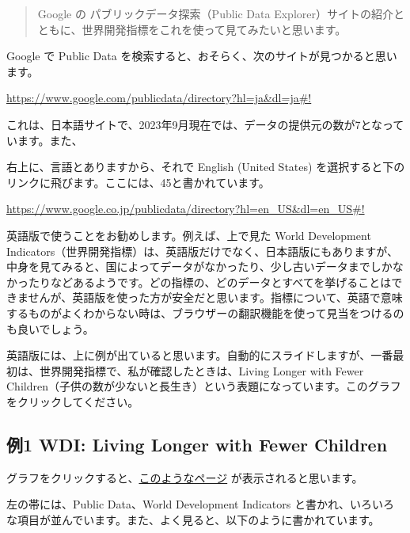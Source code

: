 \documentclass[
  xelatex, ja=standard]{bxjsbook}
\theoremstyle{definition}
\theoremstyle{definition}
\theoremstyle{definition}
\theoremstyle{definition}
\theoremstyle{remark}
\begin{document}
\begin{quote}
Google の パブリックデータ探索（Public Data Explorer）サイトの紹介とともに、世界開発指標をこれを使って見てみたいと思います。
\end{quote}

Google で Public Data を検索すると、おそらく、次のサイトが見つかると思います。

\url{https://www.google.com/publicdata/directory?hl=ja\&dl=ja\#!}

これは、日本語サイトで、2023年9月現在では、データの提供元の数が7となっています。また、

右上に、言語とありますから、それで English (United States) を選択すると下のリンクに飛びます。ここには、45と書かれています。

\url{https://www.google.co.jp/publicdata/directory?hl=en_US\&dl=en_US\#!}

英語版で使うことをお勧めします。例えば、上で見た World Development Indicators（世界開発指標）は、英語版だけでなく、日本語版にもありますが、中身を見てみると、国によってデータがなかったり、少し古いデータまでしかなかったりなどあるようです。どの指標の、どのデータとすべてを挙げることはできませんが、英語版を使った方が安全だと思います。指標について、英語で意味するものがよくわからない時は、ブラウザーの翻訳機能を使って見当をつけるのも良いでしょう。

英語版には、上に例が出ていると思います。自動的にスライドしますが、一番最初は、世界開発指標で、私が確認したときは、Living Longer with Fewer Children（子供の数が少ないと長生き）という表題になっています。このグラフをクリックしてください。

\hypertarget{ux4f8b1-wdi-living-longer-with-fewer-children}{%
\subsection{例1 WDI: Living Longer with Fewer Children}\label{ux4f8b1-wdi-living-longer-with-fewer-children}}

グラフをクリックすると、\href{https://www.google.com/publicdata/explore?ds=d5bncppjof8f9_\&ctype=b\&strail=false\&nselm=s\&met_x=sp_dyn_le00_in\&scale_x=lin\&ind_x=false\&met_y=sp_dyn_tfrt_in\&scale_y=lin\&ind_y=false\&met_s=sp_pop_totl\&scale_s=lin\&ind_s=false\&dimp_c=country:region\&ifdim=country\&hl=en_US\&dl=en_US\&iconSize=0.5\&uniSize=0.035}{このようなページ} が表示されると思います。

左の帯には、Public Data、World Development Indicators と書かれ、いろいろな項目が並んでいます。また、よく見ると、以下のように書かれています。
\end{document}
